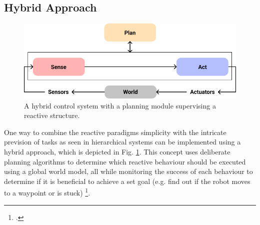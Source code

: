 \subsection{Hybrid Approach}

\begin{figure}
	\centering
	\includegraphics[width=0.9\linewidth]{img/hybrid}
	\caption{
		A hybrid control system with a planning module supervising a reactive structure. 
	}
	\label{fig:hybridApproach}
\end{figure}


One way to combine the reactive paradigms simplicity with the intricate prevision of tasks as seen in hierarchical systems can be implemented using a hybrid approach, which is depicted in Fig. \ref{fig:hybridApproach}. 
This concept uses deliberate planning algorithms to determine which reactive behaviour should be executed using a global world model, all while monitoring the success of each behaviour to determine if it is beneficial to achieve a set goal (e.g. find out if the robot moves to a waypoint or is stuck) \footcite{faigl2017controlParadigms}.

